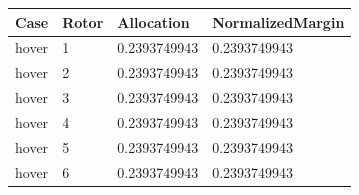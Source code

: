 \begin{tabular}{@{}llll@{}}
\toprule
Case & Rotor & Allocation & NormalizedMargin \\
\midrule
hover & 1 & 0.2393749943 & 0.2393749943 \\
hover & 2 & 0.2393749943 & 0.2393749943 \\
hover & 3 & 0.2393749943 & 0.2393749943 \\
hover & 4 & 0.2393749943 & 0.2393749943 \\
hover & 5 & 0.2393749943 & 0.2393749943 \\
hover & 6 & 0.2393749943 & 0.2393749943 \\
\bottomrule
\end{tabular}
